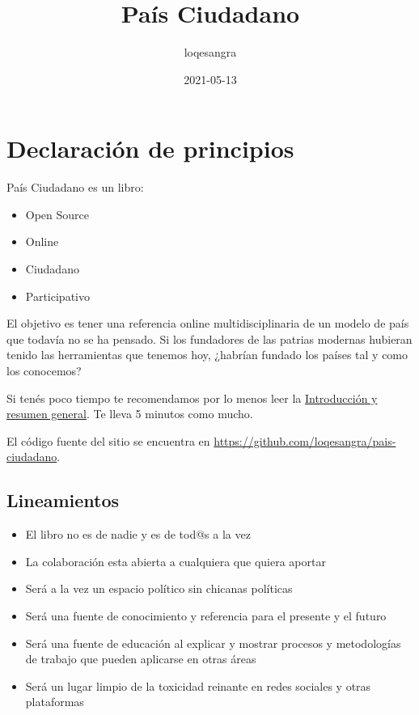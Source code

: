 \documentclass[
]{book}
\title{País Ciudadano}
\author{loqesangra}
\date{2021-05-13}
\providecommand{\tightlist}{%
  \setlength{\itemsep}{0pt}\setlength{\parskip}{0pt}}
\begin{document}
\maketitle

{
\setcounter{tocdepth}{1}
\tableofcontents
}
\hypertarget{declaraciuxf3n-de-principios}{%
\chapter{Declaración de principios}\label{declaraciuxf3n-de-principios}}

País Ciudadano es un libro:

\begin{itemize}
\tightlist
\item
  Open Source
\item
  Online
\item
  Ciudadano
\item
  Participativo
\end{itemize}

El objetivo es tener una referencia online multidisciplinaria de un modelo de país que todavía no se ha pensado. Si los fundadores de las patrias modernas hubieran tenido las herramientas que tenemos hoy, ¿habrían fundado los países tal y como los conocemos?

Si tenés poco tiempo te recomendamos por lo menos leer la \protect\hyperlink{intro}{Introducción y resumen general}. Te lleva 5 minutos como mucho.

El código fuente del sitio se encuentra en \url{https://github.com/loqesangra/pais-ciudadano}.

\hypertarget{lineamientos}{%
\section{Lineamientos}\label{lineamientos}}

\begin{itemize}
\tightlist
\item
  El libro no es de nadie y es de tod@s a la vez
\item
  La colaboración esta abierta a cualquiera que quiera aportar
\item
  Será a la vez un espacio político sin chicanas políticas
\item
  Será una fuente de conocimiento y referencia para el presente y el futuro
\item
  Será una fuente de educación al explicar y mostrar procesos y metodologías de trabajo que pueden aplicarse en otras áreas
\item
  Será un lugar limpio de la toxicidad reinante en redes sociales y otras plataformas
\end{itemize}
\end{document}
